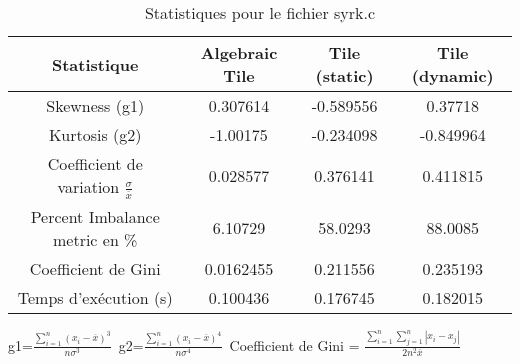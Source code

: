\documentclass{article}
\begin{document}
\begin{table}[htbp]
  \centering
  \caption{Statistiques pour le fichier syrk.c}
  \begin{tabular}{|c|c|c|c|}
    \hline
    Statistique & Algebraic Tile & Tile (static) & Tile (dynamic) \\ 
    \hline
    Skewness (g1)  & 0.307614 & -0.589556 & 0.37718 \\ 
    Kurtosis (g2)  & -1.00175 & -0.234098 & -0.849964 \\ 
    Coefficient de variation $ \frac{\sigma}{\overline{x}} $ & 0.028577 & 0.376141 & 0.411815\\ 
    Percent Imbalance metric en \% & 6.10729 & 58.0293 & 88.0085\\ 
    Coefficient de Gini  & 0.0162455 & 0.211556 & 0.235193\\ 
    Temps d'exécution (s) &  0.100436    &  0.176745   &  0.182015   \\ 

    \hline
  \end{tabular}
\end{table}
g1=$ \frac{\sum_{i=1}^{n} (x_i - \overline{x})^3}{n\sigma^3} $\
g2=$ \frac{\sum_{i=1}^{n} (x_i - \overline{x})^4}{n\sigma^4} $\
Coefficient de Gini = $ \frac{\sum_{i=1}^{n}\sum_{j=1}^{n} |x_i - x_j|}{2n^2\overline{x}} $\
\newpage
\end{document}

